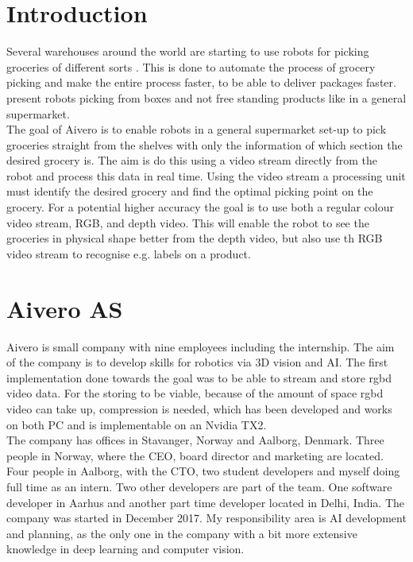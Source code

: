 \chapter{Introduction}\label{ch:intro}
Several warehouses around the world are starting to use robots for picking groceries of different sorts \citep{Olsen2018, Perez2018, Vincent2018}. This is done to automate the process of grocery picking and make the entire process faster, to be able to deliver packages faster. \cite{Olsen2018, Perez2018, Vincent2018} present robots picking from boxes and not free standing products like in a general supermarket.\\

The goal of Aivero is to enable robots in a general supermarket set-up to pick groceries straight from the shelves with only the information of which section the desired grocery is. The aim is do this using a video stream directly from the robot and process this data in real time. Using the video stream a processing unit must identify the desired grocery and find the optimal picking point on the grocery. For a potential higher accuracy the goal is to use both a regular colour video stream, RGB, and depth video. This will enable the robot to see the groceries in physical shape better from the depth video, but also use th RGB video stream to recognise e.g. labels on a product.

\chapter{Aivero AS}
Aivero is small company with nine employees including the internship. The aim of the company is to develop skills for robotics via 3D vision and AI. The first implementation done towards  the goal was to be able to stream and store \gls{rgbd} video data. For the storing to be viable, because of the amount of space \gls{rgbd} video can take up, compression is needed, which has been developed and works on both PC and is implementable on an Nvidia TX2.\\

The company has offices in Stavanger, Norway and Aalborg, Denmark. Three people in Norway, where the CEO, board director and marketing are located. Four people in Aalborg, with the CTO, two student developers and myself doing full time as an intern. Two other developers are part of the team. One software developer in Aarhus and another part time developer located in Delhi, India. The company was started in December 2017. My responsibility area is AI development and planning, as the only one in the company with a bit more extensive knowledge in deep learning and computer vision.

